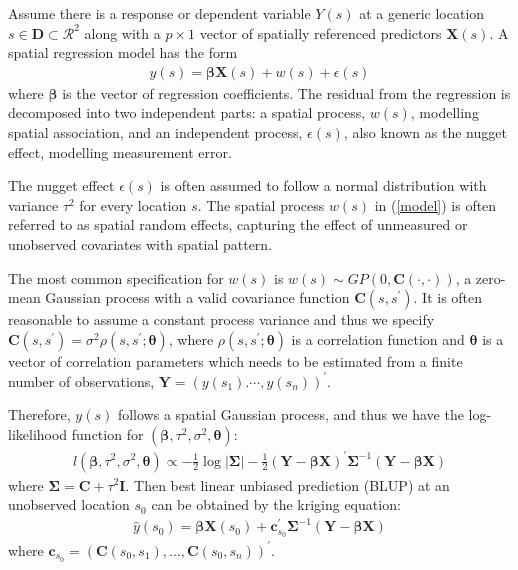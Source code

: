 \documentclass[
12pt, %
a4paper, %
oneside, %
headinclude,footinclude, %
BCOR5mm, %
]{scrartcl}
\begin{document}
Assume there is a response or dependent variable $Y(s)$ at a generic location $s \in \boldsymbol{D} \subset \mathcal{R}^2$ along with a $p \times 1$ vector of spatially referenced predictors $\boldsymbol{X}(s)$. A spatial regression model has the form
\begin{equation}
\begin{aligned}
y(s) = \boldsymbol{\beta}\boldsymbol{X}(s) + w(s) + \epsilon(s)
\end{aligned} \label{model}
\end{equation}
where $\boldsymbol{\beta}$ is the vector of regression coefficients. The residual from the regression is decomposed into two independent parts: a spatial process, $w(s)$, modelling spatial association, and an independent process, $\epsilon(s)$, also known as the nugget effect, modelling measurement error.

The nugget effect $\epsilon(s)$ is often assumed to follow a normal distribution with variance $\tau^2$ for every location $s$.
The spatial process $w(s)$ in (\ref{model}) is often referred to as spatial random effects, capturing the effect of unmeasured or unobserved covariates with spatial pattern.

The most common specification for $w(s)$ is $w(s) \sim GP(0, \boldsymbol{C}(\cdot, \cdot))$, a zero-mean Gaussian process with a valid covariance function $\boldsymbol{C}(s, s^\prime)$. It is often reasonable to assume a constant process variance and thus we specify \
$\boldsymbol{C}(s, s^\prime) = \sigma^2 \rho (s, s^\prime; \boldsymbol{\theta})$, where $\rho (s, s^\prime; \boldsymbol{\theta})$ is a correlation function and $\boldsymbol{\theta}$ is a vector of correlation parameters which needs to be estimated from a finite number of observations, $\boldsymbol{Y} = \left(y(s_1). \cdots, y(s_n)\right)^\prime$.

Therefore, $y(s)$ follows a spatial Gaussian process, and thus we have the log-likelihood function for $(\boldsymbol{\beta}, \tau^2, \sigma^2, \boldsymbol{\theta}):$
\begin{equation}
\begin{aligned}
l(\boldsymbol{\beta}, \tau^2, \sigma^2, \boldsymbol{\theta}) \propto  - \frac{1}{2}\log |\boldsymbol{\Sigma}| - \frac{1}{2}\left(\boldsymbol{Y} - \boldsymbol{\beta}\boldsymbol{X}\right)^\prime \boldsymbol{\Sigma}^{- 1}\left(\boldsymbol{Y} - \boldsymbol{\beta}\boldsymbol{X}\right)
\end{aligned} \label{loglik}
\end{equation}
where $\boldsymbol{\Sigma} = \boldsymbol{C} + \tau^2\boldsymbol{I}.$
Then best linear unbiased prediction (BLUP) at an unobserved location $s_0$ can be obtained by the kriging
equation:
\begin{equation}
\begin{aligned}
\hat{y}(s_0) = \boldsymbol{\beta}\boldsymbol{X}(s_0) + \boldsymbol{c}_{s_0}^\prime\boldsymbol{\Sigma}^{- 1}\left(\boldsymbol{Y} - \boldsymbol{\beta}\boldsymbol{X}\right)
\end{aligned} \label{Kriging}
\end{equation}
where $\boldsymbol{c}_{s_0} = \left(\boldsymbol{C}(s_0, s_1), \dots, \boldsymbol{C}(s_0, s_n)\right)^\prime$.
\end{document}
